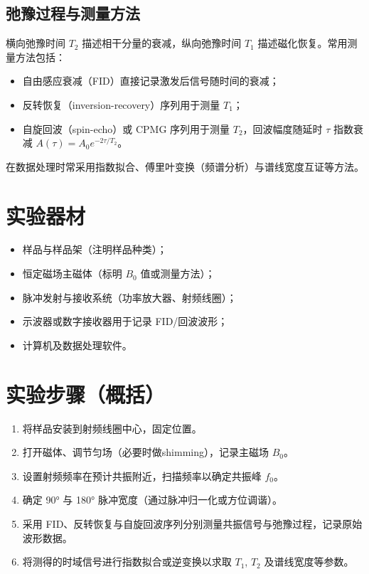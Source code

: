 \documentclass[12pt,a4paper]{article}
\begin{document}
\subsection{弛豫过程与测量方法}
横向弛豫时间 $T_2$ 描述相干分量的衰减，纵向弛豫时间 $T_1$ 描述磁化恢复。常用测量方法包括：
\begin{itemize}
    \item 自由感应衰减（FID）直接记录激发后信号随时间的衰减；
    \item 反转恢复（inversion-recovery）序列用于测量 $T_1$；
    \item 自旋回波（spin-echo）或 CPMG 序列用于测量 $T_2$，回波幅度随延时 $\tau$ 指数衰减 $A(\tau)=A_0e^{-2\tau/T_2}$。
\end{itemize}

在数据处理时常采用指数拟合、傅里叶变换（频谱分析）与谱线宽度互证等方法。

\section{实验器材}
\begin{itemize}
    \item 样品与样品架（注明样品种类）；
    \item 恒定磁场主磁体（标明 $B_0$ 值或测量方法）；
    \item 脉冲发射与接收系统（功率放大器、射频线圈）；
    \item 示波器或数字接收器用于记录 FID/回波波形；
    \item 计算机及数据处理软件。
\end{itemize}

\section{实验步骤（概括）}
\begin{enumerate}
    \item 将样品安装到射频线圈中心，固定位置。
    \item 打开磁体、调节匀场（必要时做shimming），记录主磁场 $B_0$。
    \item 设置射频频率在预计共振附近，扫描频率以确定共振峰 $f_0$。
    \item 确定 90° 与 180° 脉冲宽度（通过脉冲归一化或方位调谐）。
    \item 采用 FID、反转恢复与自旋回波序列分别测量共振信号与弛豫过程，记录原始波形数据。
    \item 将测得的时域信号进行指数拟合或逆变换以求取 $T_1$, $T_2$ 及谱线宽度等参数。
\end{enumerate}
\end{document}
